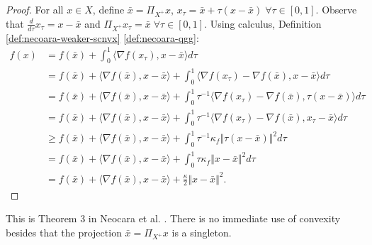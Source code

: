\documentclass[12pt]{report}
\begin{document}
            \begin{proof}
                For all $x \in X$, define $\bar x = \Pi_{X^+}x$, $x_\tau = \bar x + \tau(x - \bar x)\; \forall \tau \in [0, 1]$. 
                Observe that $\frac{d}{d\tau}x_\tau = x - \bar x$ and $\Pi_{X^+}x_\tau = \bar x\; \forall \tau \in [0, 1]$. 
                Using calculus, Definition \ref{def:necoara-weaker-scnvx} \ref{def:necoara-qgg}: 
                \begin{align*}
                    f(x) &= f(\bar x) + \int_0^1 \langle \nabla f(x_\tau), x - \bar x\rangle d\tau  
                    \\
                    &= f(\bar x) + \langle \nabla f(\bar x), x - \bar x\rangle + 
                    \int_0^1 \langle \nabla f(x_\tau) - \nabla f(\bar x), x - \bar x\rangle d \tau
                    \\
                    &= 
                    f(\bar x) + \langle \nabla f(\bar x), x - \bar x\rangle + 
                    \int_0^1 \tau^{-1}\langle \nabla f(x_\tau) - \nabla f(\bar x), \tau(x - \bar x)\rangle d \tau
                    \\
                    &= 
                    f(\bar x) + \langle \nabla f(\bar x), x - \bar x\rangle + 
                    \int_0^1 \tau^{-1}\langle \nabla f(x_\tau) - \nabla f(\bar x), x_\tau - \bar x\rangle d \tau
                    \\
                    &\ge
                    f(\bar x) + \langle \nabla f(\bar x), x - \bar x\rangle + 
                    \int_0^1 \tau^{-1}\kappa_f\Vert \tau(x - \bar x)\Vert^2 d \tau
                    \\
                    &= 
                    f(\bar x) + \langle \nabla f(\bar x), x - \bar x\rangle + 
                    \int_0^1 \tau\kappa_f\Vert x - \bar x \Vert^2 d \tau
                    \\
                    &= 
                    f(\bar x) + \langle \nabla f(\bar x), x - \bar x\rangle + 
                    \frac{\kappa}{2}\Vert x - \bar x\Vert^2. 
                \end{align*}
            \end{proof}
            \begin{remark}
                This is Theorem 3 in Neocara et al. \cite{necoara_linear_2019}. 
                There is no immediate use of convexity besides that the projection $\bar x = \Pi_{X^+}x$ is a singleton.
            \end{remark}
\end{document}
